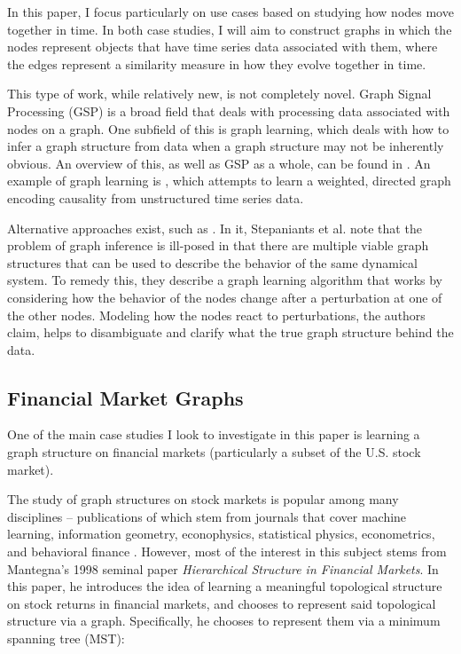 \documentclass{article}
\theoremstyle{definition}
\begin{document}
In this paper, I focus particularly on use cases based on studying how nodes move together in time. In both case studies, I will aim to construct graphs in which the nodes represent objects that have time series data associated with them, where the edges represent a similarity measure in how they evolve together in time. 

This type of work, while relatively new, is not completely novel. Graph Signal Processing (GSP) is a broad field that deals with processing data associated with nodes on a graph. One subfield of this is graph learning, which deals with how to infer a graph structure from data when a graph structure may not be inherently obvious. An overview of this, as well as GSP as a whole, can be found in \cite{gspOverview}. An example of graph learning is \cite{causalModelingGraph}, which attempts to learn a weighted, directed graph encoding causality from unstructured time series data.

Alternative approaches exist, such as \cite{PhysRevInferringCausalNetworksPerturbations}. In it, Stepaniants et al. note that the problem of graph inference is ill-posed in that there are multiple viable graph structures that can be used to describe the behavior of the same dynamical system. To remedy this, they describe a graph learning algorithm that works by considering how the behavior of the nodes change after a perturbation at one of the other nodes. Modeling how the nodes react to perturbations, the authors claim, helps to disambiguate and clarify what the true graph structure behind the data.

\subsection{Financial Market Graphs}

One of the main case studies I look to investigate in this paper is learning a graph structure on financial markets (particularly a subset of the U.S. stock market). 

The study of graph structures on stock markets is popular among many disciplines -- publications of which stem from journals that cover machine learning, information geometry, econophysics, statistical physics, econometrics, and behavioral finance \cite{networkSurveyFinance}. However, most of the interest in this subject stems from Mantegna's 1998 seminal paper \cite{mantegnaSeminalPaper} \textit{Hierarchical Structure in Financial Markets}. In this paper, he introduces the idea of learning a meaningful topological structure on stock returns in financial markets, and chooses to represent said topological structure via a graph. Specifically, he chooses to represent them via a minimum spanning tree (MST):
\end{document}
